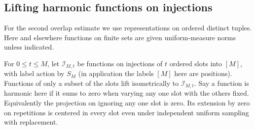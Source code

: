 \subsection{Lifting harmonic functions on injections}

For the second overlap estimate we use representations on ordered distinct tuples. Here and elsewhere functions on finite sets are given uniform-measure norms unless indicated.

\label{tra:harmonic-overlaps:injection-definition}
For $0\le t\le M$, let \(\mathcal I_{M,t}\) be functions on injections of \(t\) ordered slots into \([M]\), with label action by \(S_M\) (in application the labels \([M]\) here are positions). Functions of only a subset of the slots lift isometrically to \(\mathcal I_{M,t}\). Say a function is harmonic here if it sums to zero when varying any one slot with the others fixed. Equivalently the projection on ignoring any one slot is zero. Its extension by zero on repetitions is centered in every slot even under independent uniform sampling with replacement.

